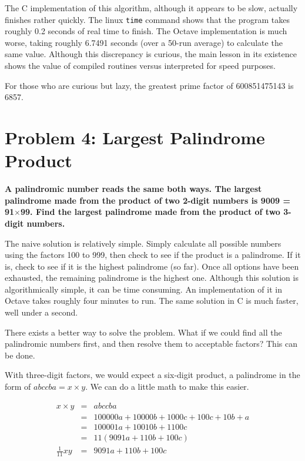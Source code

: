 \documentclass{article}
\begin{document}
The C implementation of this algorithm, although it appears to be slow, actually finishes 
rather quickly. The linux \texttt{time} command shows that the program takes roughly 0.2 
seconds of real time to finish. The Octave implementation is much worse, taking roughly 
6.7491 seconds (over a 50-run average) to calculate the same value. Although this discrepancy 
is curious, the main lesson in its existence shows the value of compiled routines versus 
interpreted for speed purposes.

For those who are curious but lazy, the greatest prime factor of 600851475143 is 6857.

\section{Problem 4: Largest Palindrome Product}

\textbf{A palindromic number reads the same both ways. The largest palindrome made from the 
product of two 2-digit numbers is 9009 = 91$\times$99. Find the largest palindrome made 
from the product of two 3-digit numbers.}

\bigskip

The naive solution is relatively simple. Simply calculate all possible numbers using the
factors 100 to 999, then check to see if the product is a palindrome. If it is, check to see
if it is the highest palindrome (so far). Once all options have been exhausted, the remaining
palindrome is the highest one. Although this solution is algorithmically simple, it can be
time consuming. An implementation of it in Octave takes roughly four minutes to run. The same
solution in C is much faster, well under a second. 

There exists a better way to solve the problem. What if we could find all the palindromic
numbers first, and then resolve them to acceptable factors? This can be done.

With three-digit factors, we would expect a six-digit product, a palindrome in the form of 
$abccba = x × y.$ We can do a little math to make this easier.

\begin{eqnarray*}
x \times y 		&	=	& abccba										\\
				&	= 	& 100000a + 10000b + 1000c + 100c + 10b + a		\\
				&	= 	& 100001a + 10010b + 1100c						\\
				&	= 	& 11(9091a + 110b + 100c)						\\
\frac{1}{11}xy	&	= 	& 9091a + 110b + 100c							\\
\end{eqnarray*}
\end{document}
